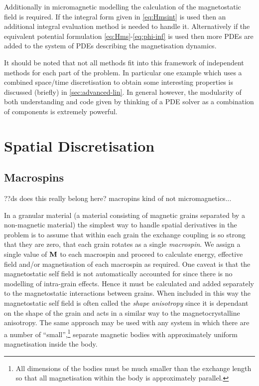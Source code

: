 Additionally in micromagnetic modelling the calculation of the magnetostatic field is required.
If the integral form given in \eqref{eq:Hmsint} is used then an additional integral evaluation method is needed to handle it.
Alternatively if the equivalent potential formulation \eqref{eq:Hms}-\eqref{eq:phi-inf} is used then more PDEs are added to the system of PDEs describing the magnetisation dynamics.

It should be noted that not all methods fit into this framework of independent methods for each part of the problem.
In particular one example which uses a combined space/time discretisation to obtain some interesting properties is discussed (briefly) in \autoref{sec:advanced-lin}.
In general however, the modularity of both understanding and code given by thinking of a PDE solver as a combination of components is extremely powerful.


\section{Spatial Discretisation}
\label{sec:spat-discr}

\subsection{Macrospins}
\label{sec:sd-macrospins}

??ds does this really belong here? macropins kind of not micromagnetics...

In a granular material (a material consisting of magnetic grains separated by a non-magnetic material) the simplest way to handle spatial derivatives in the problem is to assume that within each grain the exchange coupling is so strong that they are zero, \ie that each grain rotates as a single \emph{macrospin}.
We assign a single value of $\mathbf{M}$ to each macrospin and proceed to calculate energy, effective field and/or magnetisation of each macrospin as required.
One caveat is that the magnetostatic self field is not automatically accounted for since there is no modelling of intra-grain effects.
Hence it must be calculated and added separately to the magnetostatic interactions between grains.
When included in this way the magnetostatic self field is often called the \emph{shape anisotropy} since it is dependant on the shape of the grain and acts in a similar way to the magnetocrystalline anisotropy. 
The same approach may be used with any system in which there are a number of ``small'',\footnote{All dimensions of the bodies must be much smaller than the exchange length so that all magnetisation within the body is approximately parallel.} separate magnetic bodies with approximately uniform magnetisation inside the body.


